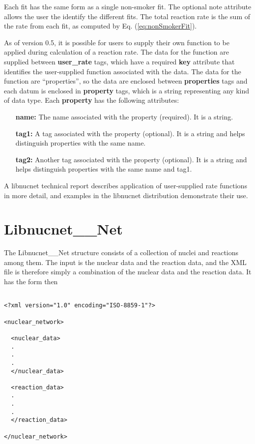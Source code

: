 \documentclass{article}    %
\begin{document}
Each fit has the same form as a single non-smoker fit.  The optional
note attribute allows the user the identify the different fits.  The total
reaction rate is the sum of the rate from each fit, as computed by
Eq. (\ref{eq:nonSmokerFit}).

As of version 0.5, it is possible for users to supply their own function
to be applied during calculation of a reaction rate.  The data for the
function are supplied between {\bf user\_rate} tags, which have a required
{\bf key} attribute that identifies the user-supplied function associated
with the data.  The data for the function are ``properties'', so the data
are enclosed between {\bf properties} tags and each datum is enclosed in {\bf
property} tags, which is a string representing any kind of data type.
Each {\bf property} has the following attributes:

\begin{itemize}

\item[{\bf name:}]  The name associated with the property (required).
It is a string.
\item[{\bf tag1:}]  A tag associated with the property (optional).  It
is a string and helps distinguish properties with the same name.
\item[{\bf tag2:}]  Another tag associated with the property (optional).  It
is a string and helps distinguish properties with the same name and tag1.

\end{itemize}

A libnucnet technical report describes application of user-supplied rate
functions in more detail, and examples in the libnucnet distribution
demonstrate their use.

\section{Libnucnet\_\_Net}

The Libnucnet\_\_Net structure consists of a collection of
nuclei and reactions among them.  The input is the nuclear
data and the reaction data, and the XML file is therefore simply
a combination of the nuclear data and the reaction data.  It has the
form then

\begin{verbatim}

<?xml version="1.0" encoding="ISO-8859-1"?>

<nuclear_network>

  <nuclear_data>
  .
  .
  .
  </nuclear_data>

  <reaction_data>
  .
  .
  .
  </reaction_data>

</nuclear_network>

\end{verbatim}
\end{document}
